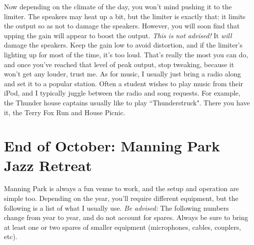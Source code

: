 \documentclass[letterpaper,10pt,oneside,headsepline]{scrreprt}
\begin{document}
Now depending on the climate of the day, you won't mind pushing it to the limiter. The speakers may heat up a bit, but the limiter is exactly that: it limits the output so as not to damage the speakers. However, you will soon find that upping the gain will appear to boost the output. \textit{This is not advised!} It \textit{will} damage the speakers. Keep the gain low to avoid distortion, and if the limiter's lighting up for most of the time, it's too loud. That's really the most you can do, and once you've reached that level of peak output, stop tweaking, because it won't get any louder, trust me. As for music, I usually just bring a radio along and set it to a popular station. Often a student wishes to play music from their iPod, and I typically juggle between the radio and song requests. For example, the Thunder house captains usually like to play ``Thunderstruck". There you have it, the Terry Fox Run and House Picnic.

\section{End of October: Manning Park Jazz Retreat}
Manning Park is always a fun venue to work, and the setup and operation are simple too. Depending on the year, you'll require different equipment, but the following is a list of what I usually use. \textit{Be advised:} The following numbers change from year to year, and do not account for spares. Always be sure to bring at least one or two spares of smaller equipment (microphones, cables, couplers, etc).
\end{document}

